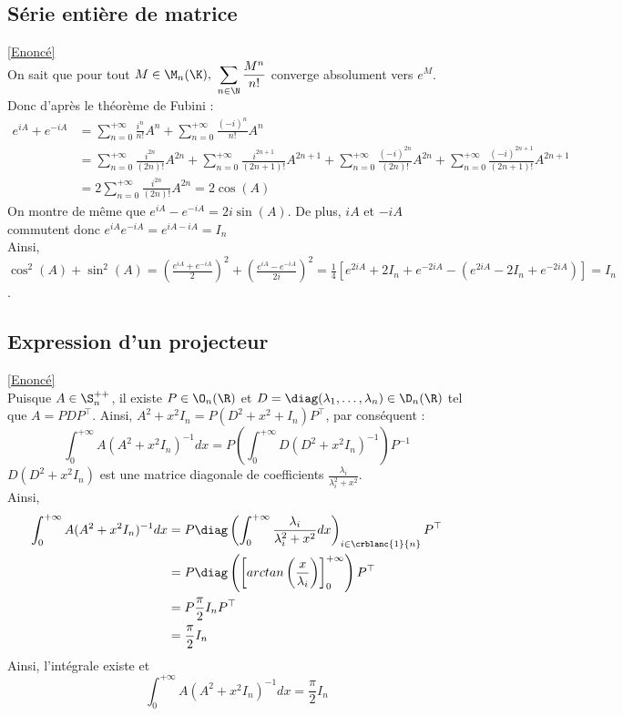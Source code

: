 \documentclass{book}
\begin{document}
	\subsection{Série entière de matrice }
	\label{sec:serie-entiere-de-matrice-etoile2}
	\textcolor{blue}{\hyperref[Série entière de matrice]{[Enoncé]}}\\
	On sait que pour tout $M\in \M_n(\K),\ \displaystyle\sum_{n\in \N}\frac{M^n}{n!}$ converge absolument vers $e^M$. Donc d'après le théorème de Fubini :
	\begin{align*}
		e^{iA}+e^{-iA}&=\displaystyle\sum_{n=0}^{+\infty}\frac{i^n}{n!}A^n+\sum_{n=0}^{+\infty}\frac{(-i)^n}{n!}A^n\\
		&=\sum_{n=0}^{+\infty}\frac{i^{2n}}{(2n)!}A^{2n}+\sum_{n=0}^{+\infty}\frac{i^{2n+1}}{(2n+1)!}A^{2n+1}+\sum_{n=0}^{+\infty}\frac{(-i)^{2n}}{(2n)!}A^{2n}+\sum_{n=0}^{+\infty}\frac{(-i)^{2n+1}}{(2n+1)!}A^{2n+1}\\
		&=2\sum_{n=0}^{+\infty}\frac{i^{2n}}{(2n)!}A^{2n}=2\cos(A)
	\end{align*}
	On montre de même que $e^{iA}-e^{-iA}=2i\sin(A)$. De plus, $iA$ et $-iA$ commutent donc $e^{iA}e^{-iA}=e^{iA-iA}=I_n$\\
	Ainsi, $\cos^2(A)+\sin^2(A)=\displaystyle\left(\frac{e^{iA}+e^{-iA}}{2}\right)^2+\left(\frac{e^{iA}-e^{-iA}}{2i}\right)^2=\frac{1}{4}\left[e^{2iA}+2I_n+e^{-2iA}-\left(e^{2iA}-2I_n+e^{-2iA}\right)\right]=I_n$.
	
	\subsection{Expression d'un projecteur}
	\label{sec:expression-dun-projecteur}
	\textcolor{blue}{\hyperref[Expression d'un projecteur]{[Enoncé]}}\\
	Puisque $A\in\S_n^{++}$, il existe $P\in \O_n(\R)$ et $D=\diag(\lambda_1,\dots,\lambda_n)\in\D_n(\R)$ tel que $A=PDP^\top$.
	Ainsi, $A^2+x^2I_n=P(D^2+x^2+I_n)P^\top$, par conséquent :
	\[\int_{0}^{+\infty}A(A^2+x^2I_n)^{-1}dx=P\left(\int_{0}^{+\infty}D(D^2+x^2I_n)^{-1}\right)P^{-1}\]
	$D(D^2+x^2I_n)$ est une matrice diagonale de coefficients $\displaystyle \frac{\lambda_i}{\lambda_i^2+x^2}$.\\
	Ainsi, \begin{align*}
		\int_{0}^{+\infty}A(A^2+x^2I_n)^{-1}dx&=P\diag\left(\int_{0}^{+\infty}\frac{\lambda_i}{\lambda_i^2+x^2}dx\right)_{i\in\crblanc{1}{n}}P^\top\\
		&=P\diag\left(\left[arctan\left(\frac{x}{\lambda_i}\right)\right]_0^{+\infty}\right)P^\top\\
		&=P\frac{\pi}{2}I_nP^\top\\
		&=\frac{\pi}{2}I_n
	\end{align*}
	Ainsi, l'intégrale existe et \[\int_{0}^{+\infty}A(A^2+x^2I_n)^{-1}dx=\frac{\pi}{2}I_n\]
\end{document}
